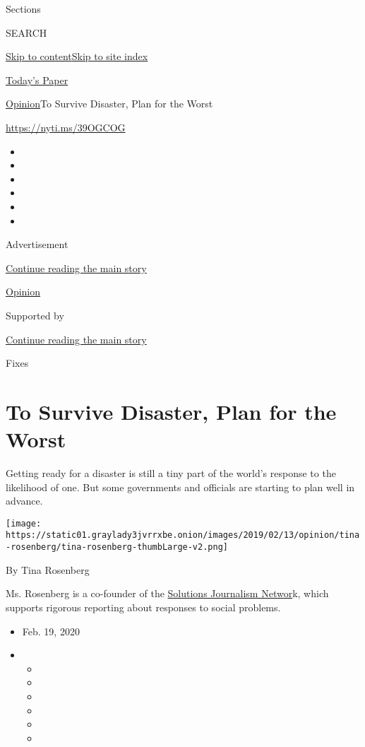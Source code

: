 Sections

SEARCH

\protect\hyperlink{site-content}{Skip to
content}\protect\hyperlink{site-index}{Skip to site index}

\href{https://myaccount.nytimes3xbfgragh.onion/auth/login?response_type=cookie\&client_id=vi}{}

\href{https://www.nytimes3xbfgragh.onion/section/todayspaper}{Today's
Paper}

\href{/section/opinion}{Opinion}\textbar{}To Survive Disaster, Plan for
the Worst

\url{https://nyti.ms/39OGCOG}

\begin{itemize}
\item
\item
\item
\item
\item
\item
\end{itemize}

Advertisement

\protect\hyperlink{after-top}{Continue reading the main story}

\href{/section/opinion}{Opinion}

Supported by

\protect\hyperlink{after-sponsor}{Continue reading the main story}

Fixes

\hypertarget{to-survive-disaster-plan-for-the-worst}{%
\section{To Survive Disaster, Plan for the
Worst}\label{to-survive-disaster-plan-for-the-worst}}

Getting ready for a disaster is still a tiny part of the world's
response to the likelihood of one. But some governments and officials
are starting to plan well in advance.

\texttt{[image: https://static01.graylady3jvrrxbe.onion/images/2019/02/13/opinion/tina-rosenberg/tina-rosenberg-thumbLarge-v2.png]}

By Tina Rosenberg

Ms. Rosenberg is a co-founder of the
\href{http://solutionsjournalism.org}{Solutions Journalism Networ}k,
which supports rigorous reporting about responses to social problems.

\begin{itemize}
\item
  Feb. 19, 2020
\item
  \begin{itemize}
  \item
  \item
  \item
  \item
  \item
  \item
  \end{itemize}
\end{itemize}

